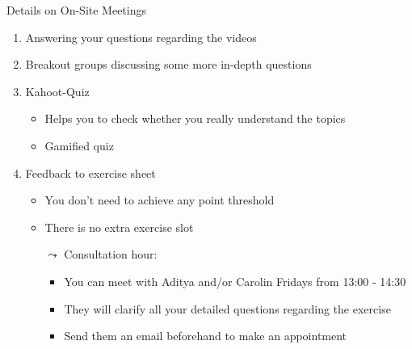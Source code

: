 \documentclass[aspectratio=169]{../latex_main/tntbeamer}  %
\begin{document}
\begin{frame}[c]{Details on On-Site Meetings}
	
	\begin{enumerate}
	    \item Answering your questions regarding the videos
	    \item Breakout groups discussing some more in-depth questions
		\item Kahoot-Quiz
		\begin{itemize}
		    \item Helps you to check whether you really understand the topics
		    \item Gamified quiz 
		\end{itemize}
		\item Feedback to exercise sheet
		\begin{itemize}
			\item You don't need to achieve any point threshold
                \item There is no extra exercise slot
                \item[$\leadsto$] Consultation hour: 
                \begin{itemize}
                    \item You can meet with Aditya and/or Carolin Fridays from 13:00 - 14:30 
                    \item They will clarify all your detailed questions regarding the exercise
                    \item Send them an email beforehand to make an appointment
                \end{itemize}
		\end{itemize}
	\end{enumerate}
	
\end{frame}
\end{document}

